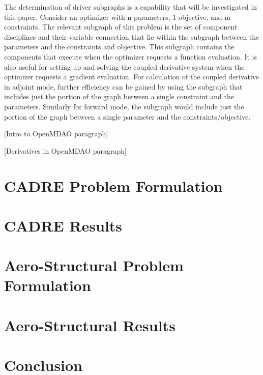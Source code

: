 \documentclass[]{aiaa-tc} %
\begin{document}
    The determination of driver subgraphs is a capability that will be investigated in this paper.
    Consider an optimizer with n parameters, 1 objective, and m constraints. The relevant 
    subgraph of this problem is the set of component disciplines and their variable connection that
    lie within the subgraph between the parameters and the constraints and objective. This subgraph
    contains the components that execute when the optimizer requests a function evaluation. It is
    also useful for setting up and solving the coupled derivative system when the optimizer requests
    a gradient evaluation. For calculation of the coupled derivative in adjoint mode, further
    efficiency can be gained by using the subgraph that includes just the portion of the graph 
    between a single constraint and the parameters. Similarly for forward mode, the subgraph would
    include just the portion of the graph between a single parameter and the constraints/objective.

    [Intro to OpenMDAO paragraph]

    [Derivatives in OpenMDAO paragraph]

  \section{CADRE Problem Formulation }

  \section{CADRE Results}

  \section{Aero-Structural Problem Formulation}

  \section{Aero-Structural Results}

  \section{Conclusion}
 
  
\end{document}
